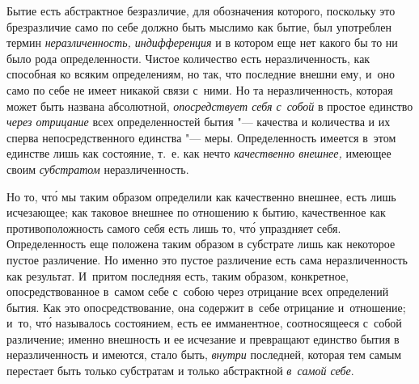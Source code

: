
Бытие есть абстрактное безразличие, для обозначения которого, поскольку это
брезразличие само по себе должно быть мыслимо как бытие, был употреблен
термин {\em неразличенность, индифференция}
и в котором еще нет какого бы то ни было рода определенности. Чистое количество
есть неразличенность, как способная ко всяким определениям, но так, что
последние внешни ему, и~оно само по себе не имеет никакой связи с~ними. Но та
неразличенность, которая может быть названа абсолютной, {\em опосредствует себя
с~собой} в простое единство {\em через отрицание} всех определенностей бытия
"--- качества и количества и их сперва непосредственного единства "--- меры.
Определенность имеется в~этом единстве лишь как состояние, т.~е. как нечто
{\em качественно внешнее,} имеющее своим {\em субстратом} неразличенность.

Но то, чт\'{о} мы таким образом определили как качественно внешнее, есть лишь
исчезающее; как таковое внешнее по отношению к бытию, качественное как
противоположность самого себя есть лишь то, чт\'{о} упраздняет себя.
Определенность еще положена таким образом в субстрате лишь как некоторое пустое
различение. Но именно это пустое различение есть сама неразличенность
как результат. И~притом последняя есть, таким образом, конкретное,
опосредствованное в~самом себе с~собою через отрицание всех определений бытия.
Как это опосредствование, она содержит в~себе отрицание и~отношение; и~то,
чт\'{о} называлось состоянием, есть ее имманентное, соотносящееся с~собой
различение; именно внешность и ее исчезание и превращают единство бытия
в неразличенность и имеются, стало быть, {\em внутри} последней, которая тем
самым перестает быть только субстратам и только абстрактной {\em в~самой себе}.

